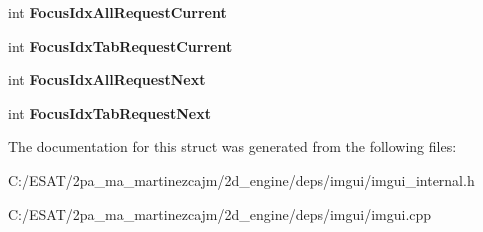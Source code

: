 \begin{DoxyCompactItemize}
\mbox{\label{struct_im_gui_window_adfbeeeaa2eebd054ec0cd99dccb34f2f}} 
int {\bfseries Focus\+Idx\+All\+Request\+Current}
\item 
\mbox{\label{struct_im_gui_window_a71c9ea6561a07160e5ce552db1d64b0b}} 
int {\bfseries Focus\+Idx\+Tab\+Request\+Current}
\item 
\mbox{\label{struct_im_gui_window_a152487f402088ce413bb6c215b308c34}} 
int {\bfseries Focus\+Idx\+All\+Request\+Next}
\item 
\mbox{\label{struct_im_gui_window_af7e93a1027da314fe73b64d97bfa73be}} 
int {\bfseries Focus\+Idx\+Tab\+Request\+Next}
\end{DoxyCompactItemize}


The documentation for this struct was generated from the following files\+:\begin{DoxyCompactItemize}
\item 
C\+:/\+E\+S\+A\+T/2pa\+\_\+ma\+\_\+martinezcajm/2d\+\_\+engine/deps/imgui/imgui\+\_\+internal.\+h\item 
C\+:/\+E\+S\+A\+T/2pa\+\_\+ma\+\_\+martinezcajm/2d\+\_\+engine/deps/imgui/imgui.\+cpp\end{DoxyCompactItemize}
